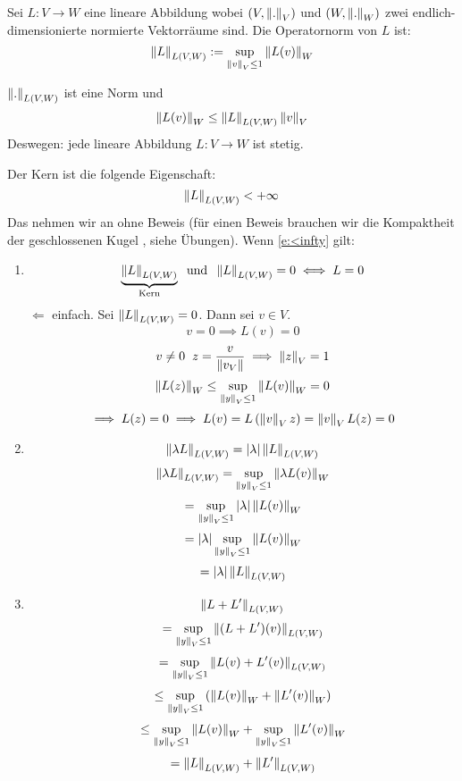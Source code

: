 \begin{Def}
  Sei $L:V\to W$ eine lineare Abbildung wobei $(V,\left\| . \right\|_V)$ und $(W,\left\| . \right\|_W)$ zwei endlich-dimensionierte normierte Vektorräume sind. Die Operatornorm von $L$ ist:
  \[\left\| L \right\|_{L(V,W)}:=\sup_{\left\| v \right\|_V\leq 1}\left\| L(v) \right\|_W\]
\end{Def}
\begin{Sat}
  $\left\| . \right\|_{L(V,W)}$ ist eine Norm und
  \[\left\| L(v) \right\|_W\leq \left\| L \right\|_{L(V,W)}\left\| v \right\|_V\]
  Deswegen: jede lineare Abbildung $L:V\to W$ ist stetig.
\end{Sat}
\begin{Bew}
  Der Kern ist die folgende Eigenschaft:
  \begin{equation}\label{e:<infty}
\left\| L \right\|_{L(V,W)}<+\infty\, 
\end{equation}
Das nehmen wir an ohne Beweis (f\"ur einen Beweis brauchen wir die Kompaktheit der geschlossenen
Kugel , siehe \"Ubungen).
  Wenn \eqref{e:<infty} gilt:
  \begin{enumerate}
    \item 
      \[\underbrace{\left\| L \right\|_{L(V,W)}}_\text{Kern}\hspace{2mm}\text{und}\hspace{2mm}\left\| L \right\|_{L(V,W)}=0\iff L=0\]
      $\Leftarrow$ einfach. Sei $\left\| L \right\|_{L(V,W)}=0$. Dann sei $v\in V$.
      \[v=0\implies L(v)=0\]
      \[v\neq 0\hspace{2mm} z = \frac{v}{\left\| v_V \right\|}\implies \left\| z \right\|_V=1\]
      \[\left\| L(z) \right\|_W\leq\sup_{\left\| y \right\|_V\leq 1}\left\| L(v) \right\|_W=0\]
      \[\implies L(z)=0\implies L(v)=L\left( \left\| v \right\|_V z \right)=\left\| v \right\|_VL(z)=0\]
    \item
      \[\left\| \lambda L \right\|_{L(V,W)}=\left| \lambda \right|\left\| L \right\|_{L(V,W)}\]
      \[\left\| \lambda L \right\|_{L(V,W)}=\sup_{\left\| y \right\|_V\leq 1}\left\| \lambda L(v) \right\|_W\]
      \[=\sup_{\left\| y \right\|_V\leq 1}\left| \lambda \right|\left\| L(v) \right\|_W\]
      \[=\left| \lambda \right|\sup_{\left\| y \right\|_V\leq 1}\left\| L(v) \right\|_W\]
      \[=\left| \lambda \right|\left\| L \right\|_{L(V,W)}\]
    \item
      \[\left\| L+L' \right\|_{L(V,W)}\]
      \[=\sup_{\left\| y \right\|_V\leq 1}\left\| (L+L')(v) \right\|_{L(V,W)}\]
      \[=\sup_{\left\| y \right\|_V\leq 1}\left\| L(v)+L'(v) \right\|_{L(V,W)}\]
      \[\leq\sup_{\left\| y \right\|_V\leq 1}\left( \left\| L(v) \right\|_W+\left\| L'(v) \right\|_W\right)\]
      \[\leq\sup_{\left\| y \right\|_V\leq 1}\left\| L(v) \right\|_W+\sup_{\left\| y \right\|_V\leq 1}\left\| L'(v) \right\|_W\]
      \[=\left\| L \right\|_{L(V,W)}+\left\| L' \right\|_{L(V,W)}\]
        \end{enumerate}
\end{Bew}
